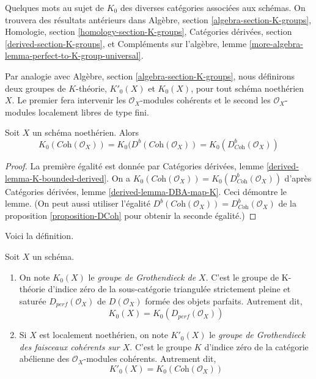 \noindent
Quelques mots au sujet de $K_0$ des diverses catégories associées aux schémas.
On trouvera des résultats antérieurs dans
Algèbre, section \ref{algebra-section-K-groups},
Homologie, section \ref{homology-section-K-groups},
Catégories dérivées, section \ref{derived-section-K-groups}, et
Compléments sur l'algèbre, lemme \ref{more-algebra-lemma-perfect-to-K-group-universal}.

\medskip\noindent
Par analogie avec Algèbre, section \ref{algebra-section-K-groups},
nous définirons deux groupes de $K$-théorie, $K'_0(X)$ et $K_0(X)$, pour tout schéma
noethérien $X$. Le premier fera intervenir les $\mathcal{O}_X$-modules cohérents
et le second les $\mathcal{O}_X$-modules localement libres de type fini.

\begin{lemma}
\label{lemma-Noetherian-Kprime}
Soit $X$ un schéma noethérien. Alors
$$
K_0(\textit{Coh}(\mathcal{O}_X)) =
K_0(D^b(\textit{Coh}(\mathcal{O}_X)) =
K_0(D^b_{\textit{Coh}}(\mathcal{O}_X))
$$
\end{lemma}

\begin{proof}
La première égalité est donnée par
Catégories dérivées, lemme \ref{derived-lemma-K-bounded-derived}.
On a $K_0(\textit{Coh}(\mathcal{O}_X)) =
K_0(D^b_{\textit{Coh}}(\mathcal{O}_X))$ d'après
Catégories dérivées, lemme \ref{derived-lemma-DBA-map-K}.
Ceci démontre le lemme.
(On peut aussi utiliser l'égalité
$D^b(\textit{Coh}(\mathcal{O}_X)) = D^b_{\textit{Coh}}(\mathcal{O}_X)$
de la proposition \ref{proposition-DCoh} pour obtenir la seconde
égalité.)
\end{proof}

\noindent
Voici la définition.

\begin{definition}
\label{definition-K-group}
Soit $X$ un schéma.
\begin{enumerate}
\item On note $K_0(X)$ le {\it groupe de Grothendieck de $X$}. C'est le
groupe de K-théorie d'indice zéro de la sous-catégorie triangulée
strictement pleine et saturée $D_{perf}(\mathcal{O}_X)$ de $D(\mathcal{O}_X)$
formée des objets parfaits. Autrement dit,
$$
K_0(X) = K_0(D_{perf}(\mathcal{O}_X))
$$
\item Si $X$ est localement noethérien, on note $K'_0(X)$ le
{\it groupe de Grothendieck des faisceaux cohérents sur $X$}. C'est le
groupe $K$ d'indice zéro de la catégorie abélienne
des $\mathcal{O}_X$-modules cohérents. Autrement dit,
$$
K'_0(X) = K_0(\textit{Coh}(\mathcal{O}_X))
$$
\end{enumerate}
\end{definition}

